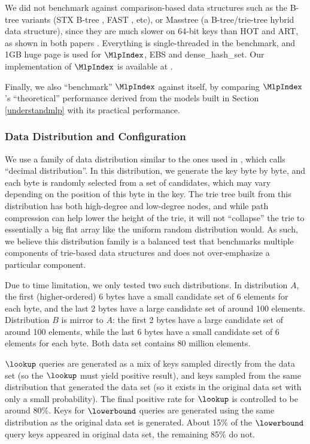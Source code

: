 \documentclass[11pt, usletter]{article}
\begin{document}
We did not benchmark against comparison-based data structures such as the B-tree variants 
(STX B-tree \cite{stx_btree}, FAST \cite{fast_sigmod10}, etc), 
or Masstree \cite{masstree} (a B-tree/trie-tree hybrid data structure),
since they are much slower on 64-bit keys than HOT and ART, as shown in both papers \cite{hot_sigmod18, arttrie_icde13}.
Everything is single-threaded in the benchmark, and 1GB huge page is used for $\MlpIndex$, EBS and dense\_hash\_set. 
Our implementation of $\MlpIndex$ is available at \cite{mlpds_repo}.

Finally, we also ``benchmark'' $\MlpIndex$ against itself, 
by comparing $\MlpIndex$'s ``theoretical'' performance derived from the models built in Section \ref{understandmlp} 
with its practical performance. 

\subsubsection*{Data Distribution and Configuration}

We use a family of data distribution similar to the ones used in \cite{masstree}, which \cite{masstree} calls ``decimal distribution''. 
In this distribution, we generate the key byte by byte, and each byte is randomly selected from a set of candidates, 
which may vary depending on the position of this byte in the key.
The trie tree built from this distribution has both high-degree and low-degree nodes, 
and while path compression can help lower the height of the trie, it will not ``collapse'' the trie 
to essentially a big flat array like the uniform random distribution would. 
As such, we believe this distribution family is a balanced test that 
benchmarks multiple components of trie-based data structures and does not over-emphasize a particular component. 

Due to time limitation, we only tested two such distributions. 
In distribution $A$, the first (higher-ordered) 6 bytes have a small candidate set of 6 elements for each byte, 
and the last 2 bytes have a large candidate set of around 100 elements. 
Distribution $B$ is mirror to $A$: the first 2 bytes have a large candidate set of around 100 elements,
while the last 6 bytes have a small candidate set of 6 elements for each byte.
Both data set contains 80 million elements.

$\lookup$ queries are generated as a mix of keys sampled directly from the data set (so the $\lookup$ must yield positive result),
and keys sampled from the same distribution that generated the data set (so it exists in the original data set 
with only a small probability). The final positive rate for $\lookup$ is controlled to be around 80\%. 
Keys for $\lowerbound$ queries are generated using the same distribution as the original data set is generated. 
About 15\% of the $\lowerbound$ query keys appeared in original data set, the remaining 85\% do not. 
\end{document}
